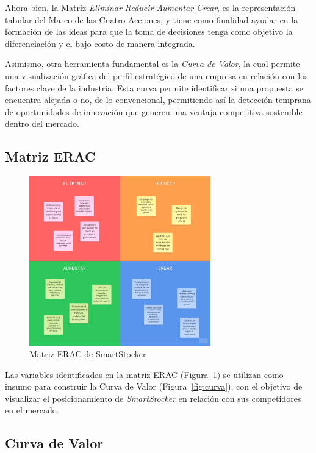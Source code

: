 Ahora bien, la Matriz \emph{Eliminar-Reducir-Aumentar-Crear}, es la representación tabular del Marco de las Cuatro Acciones, y tiene como finalidad ayudar en la formación de las ideas para que la toma de decisiones tenga como objetivo la diferenciación y el bajo costo de manera integrada.

Asimismo, otra herramienta fundamental es la \emph{Curva de Valor}, la cual permite una visualización gráfica del perfil estratégico de una empresa en relación con los factores clave de la industria. Esta curva permite identificar si una propuesta se encuentra alejada o no, de lo convencional, permitiendo así la detección temprana de oportunidades de innovación que generen una ventaja competitiva sostenible dentro del mercado.


\subsection{Matriz ERAC}\label{sec:erac}

\begin{figure}[htbp]
    \centering
    \includegraphics[width=0.7\textwidth]{images/matrizEric.jpeg}
    \caption{Matriz ERAC de SmartStocker}
    \label{fig:eric}
\end{figure}

Las variables identificadas en la matriz ERAC (Figura~\ref{fig:eric}) se utilizan como insumo para construir la Curva de Valor (Figura~\ref{fig:curva}), con el objetivo de visualizar el posicionamiento de \emph{SmartStocker} en relación con sus competidores en el mercado.

\FloatBarrier

\clearpage
\subsection{Curva de Valor}\label{sec:curva-valor}

